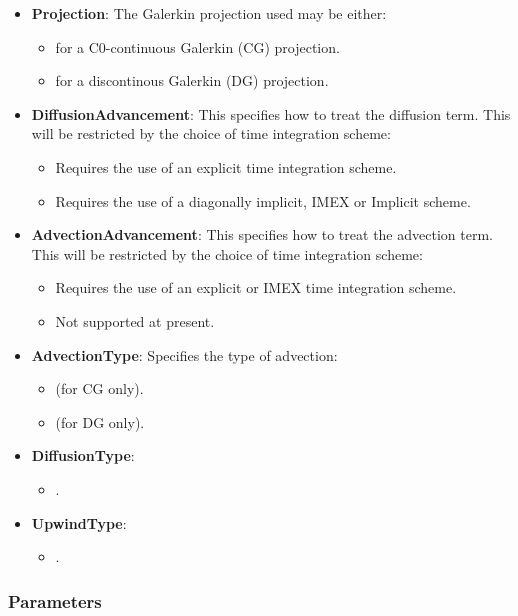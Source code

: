 \begin{itemize}
\item \textbf{Projection}: The Galerkin projection used may be either:
\begin{itemize}
	\item {} for a C0-continuous Galerkin (CG) projection.
	\item {} for a discontinous Galerkin (DG) projection.
\end{itemize}
\item \textbf{DiffusionAdvancement}: This specifies how to treat the diffusion term. This will be restricted by the choice of time integration scheme:
\begin{itemize}
	\item {} Requires the use of an explicit time integration
	scheme.
	\item {} Requires the use of a diagonally implicit, IMEX or
	Implicit scheme.
\end{itemize}
\item \textbf{AdvectionAdvancement}: This specifies how to treat the advection term. This will be restricted by the choice of time integration scheme:
\begin{itemize}
	\item {} Requires the use of an explicit or IMEX time integration
	scheme.
	\item {} Not supported at present.
\end{itemize}
\item \textbf{AdvectionType}: Specifies the type of advection:
\begin{itemize}
	\item {} (for CG only).
	\item {} (for DG only).
\end{itemize}
\item \textbf{DiffusionType}:
\begin{itemize}
	\item {}.
\end{itemize}
\item \textbf{UpwindType}:
\begin{itemize}
	\item {}.
\end{itemize}
\end{itemize}

\subsubsection{Parameters}

